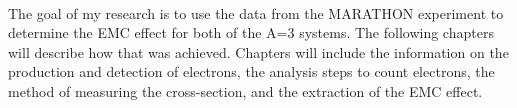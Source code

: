 \paragraph{}The goal of my research is to use the data from the MARATHON experiment to determine the EMC effect for both of the A=3 systems. The following chapters will describe how that was achieved. Chapters will include the information on the production and detection of electrons, the analysis steps to count electrons, the method of measuring the cross-section, and the extraction of the EMC effect.  



